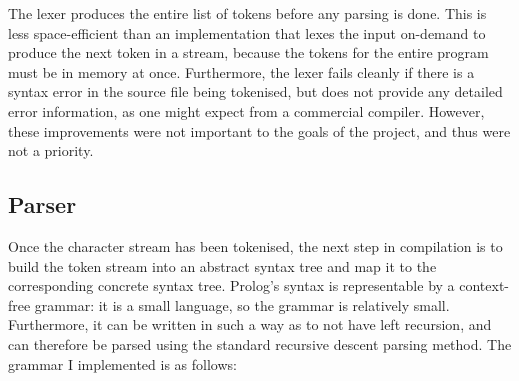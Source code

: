 \documentclass[12pt]{article}
\begin{document}
The lexer produces the entire list of tokens before any parsing is done. 
This is less space-efficient than an implementation that lexes the input on-demand to produce the next token in a stream, because the tokens for the entire program must be in memory at once. 
Furthermore, the lexer fails cleanly if there is a syntax error in the source file being tokenised, but does not provide any detailed error information, as one might expect from a commercial compiler. 
However, these improvements were not important to the goals of the project, and thus were not a priority.

\vspace{-5px}

\subsection{Parser}

\vspace{-3px}

Once the character stream has been tokenised, the next step in compilation is to build the token stream into an abstract syntax tree and map it to the corresponding concrete syntax tree. 
Prolog's syntax is representable by a context-free grammar: it is a small language, so the grammar is relatively small. 
Furthermore, it can be written in such a way as to not have left recursion, and can therefore be parsed using the standard recursive descent parsing method. 
The grammar I implemented is as follows:

\end{document}
